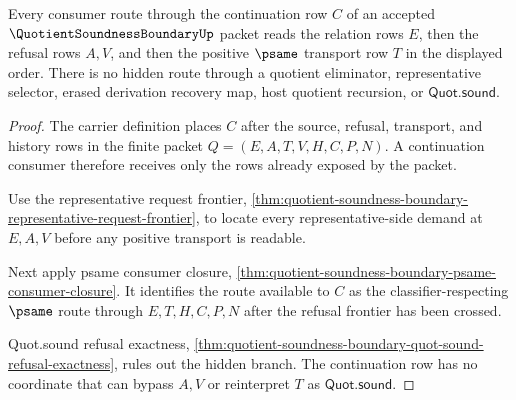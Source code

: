 \begin{theorem}
\label{thm:quotient-soundness-boundary-cont-route-locality}
Every consumer route through the continuation row $C$ of an accepted $\QuotientSoundnessBoundaryUp$ packet reads the relation rows $E$, then the refusal rows $A,V$, and then the positive $\psame$ transport row $T$ in the displayed order. There is no hidden route through a quotient eliminator, representative selector, erased derivation recovery map, host quotient recursion, or $\mathsf{Quot.sound}$.
\end{theorem}
\begin{proof}
The carrier definition places $C$ after the source, refusal, transport, and history rows in the finite packet $Q=(E,A,T,V,H,C,P,N)$. A continuation consumer therefore receives only the rows already exposed by the packet.

Use the representative request frontier, \autoref{thm:quotient-soundness-boundary-representative-request-frontier}, to locate every representative-side demand at $E,A,V$ before any positive transport is readable.

Next apply psame consumer closure, \autoref{thm:quotient-soundness-boundary-psame-consumer-closure}. It identifies the route available to $C$ as the classifier-respecting $\psame$ route through $E,T,H,C,P,N$ after the refusal frontier has been crossed.

Quot.sound refusal exactness, \autoref{thm:quotient-soundness-boundary-quot-sound-refusal-exactness}, rules out the hidden branch. The continuation row has no coordinate that can bypass $A,V$ or reinterpret $T$ as $\mathsf{Quot.sound}$.
\end{proof}

